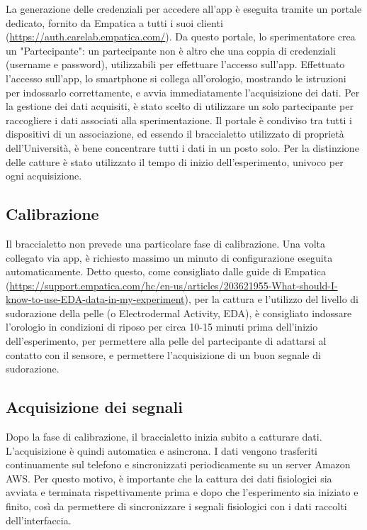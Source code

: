 La generazione delle credenziali per accedere all'app è eseguita tramite un portale dedicato, fornito da Empatica a tutti i suoi clienti (\url{https://auth.carelab.empatica.com/}). Da questo portale, lo sperimentatore crea un "Partecipante": un partecipante non è altro che una coppia di credenziali (username e password), utilizzabili per effettuare l'accesso sull'app. Effettuato l'accesso sull'app, lo smartphone si collega all'orologio, mostrando le istruzioni per indossarlo correttamente, e avvia immediatamente l'acquisizione dei dati. Per la gestione dei dati acquisiti, è stato scelto di utilizzare un solo partecipante per raccogliere i dati associati alla sperimentazione. Il portale è condiviso tra tutti i dispositivi di un associazione, ed essendo il braccialetto utilizzato di proprietà dell'Università, è bene concentrare tutti i dati in un posto solo. Per la distinzione delle catture è stato utilizzato il tempo di inizio dell'esperimento, univoco per ogni acquisizione.

\subsection{Calibrazione}

\sloppy
Il braccialetto non prevede una particolare fase di calibrazione. Una volta collegato via app, è richiesto massimo un minuto di configurazione eseguita automaticamente. Detto questo, come consigliato dalle guide di Empatica (\url{https://support.empatica.com/hc/en-us/articles/203621955-What-should-I-know-to-use-EDA-data-in-my-experiment}), per la cattura e l'utilizzo del livello di sudorazione della pelle (o Electrodermal Activity, EDA), è consigliato indossare l'orologio in condizioni di riposo per circa 10-15 minuti prima dell'inizio dell'esperimento, per permettere alla pelle del partecipante di adattarsi al contatto con il sensore, e permettere l'acquisizione di un buon segnale di sudorazione.

\subsection{Acquisizione dei segnali}
\fussy

Dopo la fase di calibrazione, il braccialetto inizia subito a catturare dati. L'acquisizione è quindi automatica e asincrona. I dati vengono trasferiti continuamente sul telefono e sincronizzati periodicamente su un server Amazon AWS. Per questo motivo, è importante che la cattura dei dati fisiologici sia avviata e terminata rispettivamente prima e dopo che l'esperimento sia iniziato e finito, così da permettere di sincronizzare i segnali fisiologici con i dati raccolti dell'interfaccia.

